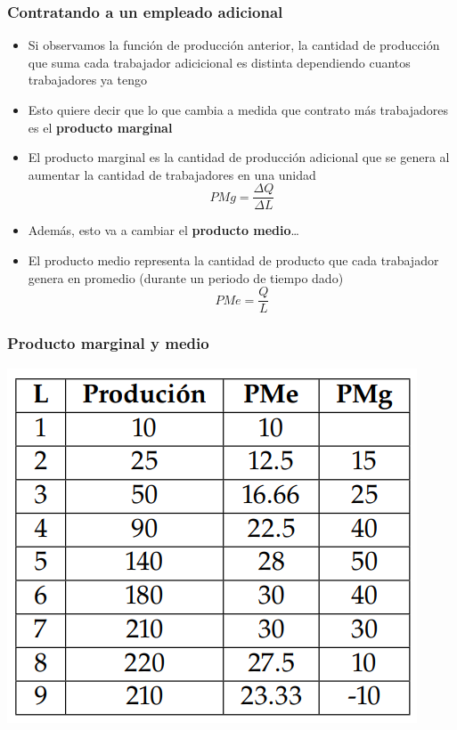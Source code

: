 \documentclass{beamer}
\begin{document}
\begin{frame}
    \frametitle{Contratando a un empleado adicional}
    \begin{itemize}
        \item Si observamos la función de producción anterior, la cantidad de producción que suma cada trabajador adicicional es distinta dependiendo cuantos trabajadores ya tengo
        \item Esto quiere decir que lo que cambia a medida que contrato más trabajadores es el \textbf{producto marginal}
        \item El producto marginal es la cantidad de producción adicional que se genera al aumentar la cantidad de trabajadores en una unidad
        \[ PMg = \frac{\Delta Q}{\Delta L} \]
        \item Además, esto va a cambiar el \textbf{producto medio}\dots
        \item El producto medio representa la cantidad de producto que cada trabajador genera en promedio (durante un periodo de tiempo dado)
        \[ PMe = \frac{Q}{L} \]
    \end{itemize}
\end{frame}

\begin{frame}
\frametitle{Producto marginal y medio}
\centering
\includegraphics[scale=0.6]{../Figures/T12.3.png}
\end{frame}
\end{document}
